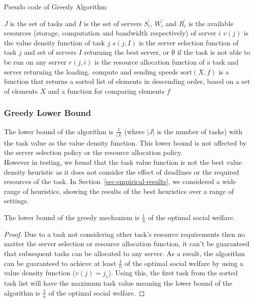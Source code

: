 \begin{algorithm}
    \caption{Pseudo code of Greedy Algorithm}
    \label{alg:greedy-mechanism}
    \begin{algorithmic}
        \REQUIRE $J$ is the set of tasks and $I$ is the set of servers
        \REQUIRE $S^{'}_i$, $W^{'}_i$ and $R^{'}_i$ is the available resources
            (storage, computation and bandwidth respectively) of server $i$
        \REQUIRE $v(j)$ is the value density function of task $j$
        \REQUIRE $s(j, I)$ is the server selection function of task $j$ and set of servers $I$ returning the best
            server, or $\emptyset$ if the task is not able to be run on any server
        \REQUIRE $r(j, i)$ is the resource allocation function of a task and server returning the
            loading, compute and sending speeds
        \REQUIRE $\text{sort}(X, f)$ is a function that returns a sorted list of elements in descending order, based
            on a set of elements $X$ and a function for comparing elements $f$

            \ENDIF
        \ENDFOR
    \end{algorithmic}
\end{algorithm}

\subsubsection{Greedy Lower Bound}
\label{subsubsec:greedy-lower-bound}
The lower bound of the algorithm is $\frac{1}{\left|J\right|}$ (where $\left|J\right|$ is the number of tasks) with
the task value as the value density function. This lower bound is not affected by the server selection policy or the
resource allocation policy. \\
However in testing, we found that the task value function is not the best value density heuristic as it does not
consider the effect of deadlines or the required resources of the task. In Section~\ref{sec:empirical-results}, we
considered a wide range of heuristics, showing the results of the best heuristics over a range of settings.

\begin{theorem}
    The lower bound of the greedy mechanism is $\frac{1}{n}$ of the optimal social welfare.
\end{theorem}
\begin{proof}
    Due to a task not considering other task's resource requirements then no matter the server selection or resource
    allocation function, it can't be guaranteed that subsequent tasks can be allocated to any server. As a result,
    the algorithm can be guaranteed to achieve at least $\frac{1}{n}$ of the optimal social welfare by using a
    value density function ($v(j) = j_v$). Using this, the first task from the sorted task list will have the maximum task
    value meaning the lower bound of the algorithm is $\frac{1}{n}$ of the optimal social welfare.
\end{proof}

